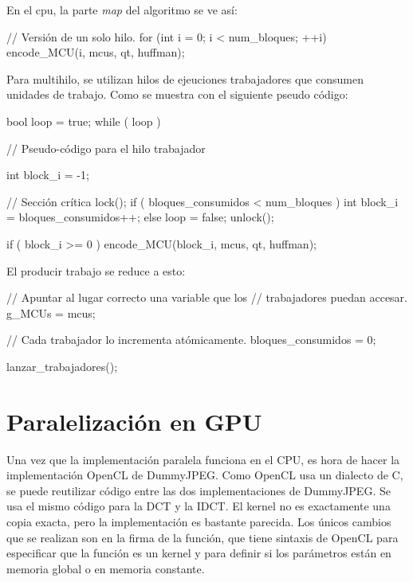 En el cpu, la parte \emph{map} del algoritmo se ve así:

\begin{code}[language=C][h]
    // Versión de un solo hilo.
    for (int i = 0; i < num_bloques; ++i) {
        encode_MCU(i, mcus, qt, huffman);
    }
\end{code}

Para multihilo, se utilizan hilos de ejeuciones trabajadores que consumen unidades
de trabajo. Como se muestra con el siguiente pseudo código:

\begin{code}[language=C][h]
    bool loop = true;
    while ( loop ) {
        // Pseudo-código para el hilo trabajador

        int block_i = -1;

        // Sección crítica
        lock();
        if ( bloques_consumidos < num_bloques ) {
            int block_i = bloques_consumidos++;
        } else {
            loop = false;
        }
        unlock();

        if ( block_i >= 0 ) {
            encode_MCU(block_i, mcus, qt, huffman);
        }
    }
\end{code}

El producir trabajo se reduce a esto:

\begin{code}[language=C][h]
    // Apuntar al lugar correcto una variable que los
    // trabajadores puedan accesar.
    g_MCUs = mcus;

    // Cada trabajador lo incrementa atómicamente.
    bloques_consumidos = 0;

    lanzar_trabajadores();
\end{code}

\section{Paralelización en GPU}

Una vez que la implementación paralela funciona en el CPU, es hora de hacer la
implementación OpenCL de DummyJPEG. Como OpenCL usa un dialecto de C, se puede
reutilizar código entre las dos implementaciones de DummyJPEG. Se usa el mismo
código para la DCT y la IDCT. El kernel no es exactamente una copia exacta,
pero la implementación es bastante parecida. Los únicos cambios que se realizan
son en la firma de la función, que tiene sintaxis de OpenCL para especificar
que la función es un kernel y para definir si los parámetros están en memoria
global o en memoria constante.

